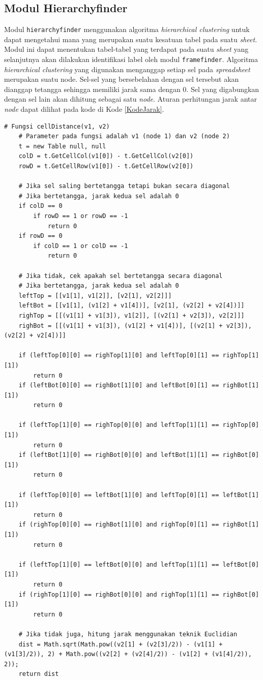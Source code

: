 	\subsection{Modul Hierarchyfinder}
	Modul \texttt{hierarchyfinder} menggunakan algoritma \textit{hierarchical clustering} untuk dapat mengetahui mana yang merupakan suatu kesatuan tabel pada suatu \textit{sheet}. Modul ini dapat menentukan tabel-tabel yang terdapat pada suatu \textit{sheet} yang selanjutnya akan dilakukan identifikasi label oleh modul \texttt{framefinder}. Algoritma \textit{hierarchical clustering} yang digunakan menganggap setiap sel pada \textit{spreadsheet} merupakan suatu node. Sel-sel yang bersebelahan dengan sel tersebut akan dianggap tetangga sehingga memiliki jarak sama dengan 0. Sel yang digabungkan dengan sel lain akan dihitung sebagai satu \textit{node}. Aturan perhitungan jarak antar \textit{node} dapat dilihat pada kode di Kode \ref{KodeJarak}.\\

	\begin{lstlisting}[frame=single, basicstyle=\linespread{1}\scriptsize\listingsfont, captionpos=b, caption={Perhitungan Jarak \textit{Node}}, label=KodeJarak]
	# Fungsi cellDistance(v1, v2)
	# Parameter pada fungsi adalah v1 (node 1) dan v2 (node 2)
	t = new Table null, null
	colD = t.GetCellCol(v1[0]) - t.GetCellCol(v2[0])
	rowD = t.GetCellRow(v1[0]) - t.GetCellRow(v2[0])

	# Jika sel saling bertetangga tetapi bukan secara diagonal
	# Jika bertetangga, jarak kedua sel adalah 0
	if colD == 0
		if rowD == 1 or rowD == -1
			return 0
	if rowD == 0
		if colD == 1 or colD == -1
			return 0

	# Jika tidak, cek apakah sel bertetangga secara diagonal
	# Jika bertetangga, jarak kedua sel adalah 0
	leftTop = [[v1[1], v1[2]], [v2[1], v2[2]]]
	leftBot = [[v1[1], (v1[2] + v1[4])], [v2[1], (v2[2] + v2[4])]]
	righTop = [[(v1[1] + v1[3]), v1[2]], [(v2[1] + v2[3]), v2[2]]]
	righBot = [[(v1[1] + v1[3]), (v1[2] + v1[4])], [(v2[1] + v2[3]), (v2[2] + v2[4])]]

	if (leftTop[0][0] == righTop[1][0] and leftTop[0][1] == righTop[1][1])
		return 0
	if (leftBot[0][0] == righBot[1][0] and leftBot[0][1] == righBot[1][1])
		return 0

	if (leftTop[1][0] == righTop[0][0] and leftTop[1][1] == righTop[0][1])
		return 0
	if (leftBot[1][0] == righBot[0][0] and leftBot[1][1] == righBot[0][1])
		return 0

	if (leftTop[0][0] == leftBot[1][0] and leftTop[0][1] == leftBot[1][1])
		return 0
	if (righTop[0][0] == righBot[1][0] and righTop[0][1] == righBot[1][1])
		return 0

	if (leftTop[1][0] == leftBot[0][0] and leftTop[1][1] == leftBot[0][1])
		return 0
	if (righTop[1][0] == righBot[0][0] and righTop[1][1] == righBot[0][1])
		return 0

	# Jika tidak juga, hitung jarak menggunakan teknik Euclidian
	dist = Math.sqrt(Math.pow((v2[1] + (v2[3]/2)) - (v1[1] + (v1[3]/2)), 2) + Math.pow((v2[2] + (v2[4]/2)) - (v1[2] + (v1[4]/2)), 2));
	return dist
	\end{lstlisting}

